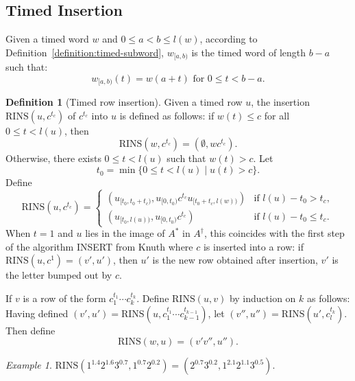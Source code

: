 \documentclass[10pt]{amsproc}
\theoremstyle{definition}
\newtheorem{definition}[theorem]{Definition}
\theoremstyle{remark}
\newtheorem{example}[theorem]{Example}
\newcommand{\rowins}{\mathrm{RINS}}
\begin{document}
\subsection{Timed Insertion}
\label{sec:timed-insertion}
Given a timed word $w$ and $0\leq a < b \leq l(w)$, according to Definition~\ref{definition:timed-subword}, $w_{[a, b)}$ is the timed word of length $b-a$ such that:
\begin{displaymath}
  w_{[a, b)}(t) = w(a+ t) \text{ for } 0\leq t<b-a.
\end{displaymath}
\begin{definition}[Timed row insertion]
  \label{definition:timed-row-insertion}
  Given a timed row $u$, the insertion $\rowins(u, c^{t_c})$ of $c^{t_c}$ into $u$ is defined as follows:
  if $w(t)\leq c$ for all $0\leq t < l(u)$, then
  \begin{displaymath}
    \rowins(w, c^{t_c}) = (\emptyset, wc^{t_c}).
  \end{displaymath}
  Otherwise, there exists $0\leq t < l(u)$ such that $w(t)>c$.
  Let
  \begin{displaymath}
    t_0 = \min\{0\leq t< l(u) \mid u(t)> c\}.
  \end{displaymath}
  Define
  \begin{displaymath}
    \rowins(u, c^{t_c}) =
    \begin{cases}
      (u_{[t_0, t_0+t_c)}, u_{[0, t_0)}c^{t_c} u_{[t_0+t_c, l(w))}) & \text{if } l(u) - t_0 > t_c,\\
      (u_{[t_0, l(u))}, u_{[0, t_0)} c^{t_c}) & \text{if } l(u) - t_0 \leq t_c.
    \end{cases}
  \end{displaymath}
  When $t=1$ and $u$ lies in the image of $A^*$ in $A^\dagger$, this coincides with the first step of the algorithm INSERT from Knuth \cite{knuth} where $c$ is inserted into a row:
  if $\rowins(u,c^1)=(v',u')$, then $u'$ is the new row obtained after insertion, $v'$ is the letter bumped out by $c$.

  If $v$ is a row of the form $c_1^{t_1}\dotsb c_k^{t_k}$.
  Define $\rowins(u,v)$ by induction on $k$ as follows:
  Having defined $(v',u')=\rowins(u,c_1^{t_1}\dotsb c_{k-1}^{t_{k-1}})$,
  let $(v'', u'')=\rowins(u',c_l^{t_k})$.
  Then define
  \begin{displaymath}
    \rowins(w,u) = (v'v'', u'').
  \end{displaymath}
\end{definition}
\begin{example}
  \label{example:timed-row-ins}
  $\rowins(1^{1.4}2^{1.6}3^{0.7},1^{0.7}2^{0.2})=(2^{0.7}3^{0.2},1^{2.1}2^{1.1}3^{0.5})$.
\end{example}
\end{document}
